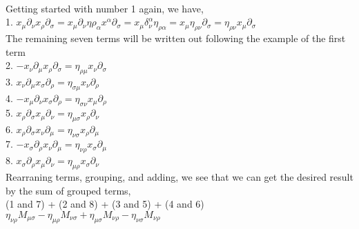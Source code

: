 \documentclass[prb,preprint]
{revtex4-1}
\begin{document}
\\
Getting started with number 1 again, we have,
\\
1.  $x_\mu \partial_\nu x_\rho \partial_\sigma = x_\mu\partial_\nu\eta{\rho_\alpha}x^\alpha \partial_\sigma = x_\mu \delta_\nu^\alpha \eta_{\rho\alpha} = x_\mu \eta_{\rho\nu} \partial_\sigma = \eta_{\rho\nu} x_\mu \partial_\sigma$
\\
The remaining seven terms will be written out following the example of the first term
\\
2.  $-x_\nu \partial_\mu x_\rho \partial_\sigma = \eta_{\rho\mu} x_\nu \partial_\sigma$
\\
3.  $x_\nu \partial_\mu x_\sigma \partial_\rho = \eta_{\sigma\mu} x_\nu \partial_\rho$
\\
4.  $-x_\mu \partial_\nu x_\sigma \partial_\rho = \eta_{\sigma\nu} x_\mu \partial_\rho$
\\
5.  $x_\rho \partial_\sigma x_\mu \partial_\nu = \eta_{\mu\sigma} x_\rho \partial_\nu$
\\
6.  $x_\rho \partial_\sigma x_\nu \partial_\mu = \eta_{\nu\sigma} x_\rho \partial_\mu$
\\
7.  $-x_\sigma \partial_\rho x_\nu \partial_\mu = \eta_{\nu\rho} x_\sigma \partial_\mu$
\\
8.  $x_\sigma \partial_\rho x_\mu \partial_\nu = \eta_{\mu\rho} x_\sigma \partial_\nu$
\\
Rearraning terms, grouping, and adding, we see that we can get the desired result by the sum of grouped terms, 
\\
(1 and 7) + (2 and 8) + (3 and 5) + (4 and 6)
\\
$\eta_{\nu\rho}M_{\mu\sigma} - \eta_{\mu\rho}M_{\nu\sigma} + \eta_{\mu\sigma}M_{\nu\rho} - \eta_{\nu\sigma}M_{\nu\rho}$




\end{document}
